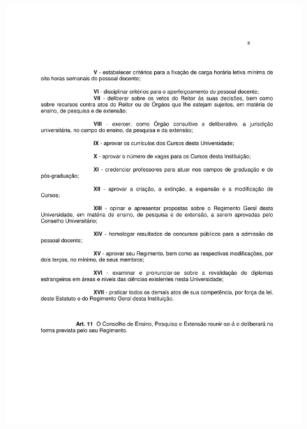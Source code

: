 \begin{figure}[p]
	\centering 
	\includegraphics[scale=0.7]{capitulos/resolucoes/cuni414/cuni414-8.pdf}
\end{figure} \pagebreak

